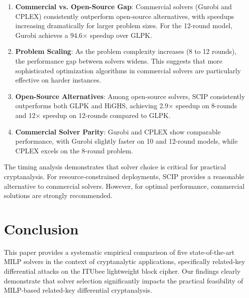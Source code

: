 \documentclass[11pt,a4paper]{article}
\begin{document}
\begin{enumerate}
    \item \textbf{Commercial vs. Open-Source Gap}: Commercial solvers (Gurobi and CPLEX) consistently outperform open-source alternatives, with speedups increasing dramatically for larger problem sizes. For the 12-round model, Gurobi achieves a 94.6$\times$ speedup over GLPK.
    
    \item \textbf{Problem Scaling}: As the problem complexity increases (8 to 12 rounds), the performance gap between solvers widens. This suggests that more sophisticated optimization algorithms in commercial solvers are particularly effective on harder instances.
    
    \item \textbf{Open-Source Alternatives}: Among open-source solvers, SCIP consistently outperforms both GLPK and HiGHS, achieving 2.9$\times$ speedup on 8-rounds and 12$\times$ speedup on 12-rounds compared to GLPK.
    
    \item \textbf{Commercial Solver Parity}: Gurobi and CPLEX show comparable performance, with Gurobi slightly faster on 10 and 12-round models, while CPLEX excels on the 8-round problem.
\end{enumerate}

The timing analysis demonstrates that solver choice is critical for practical cryptanalysis. For resource-constrained deployments, SCIP provides a reasonable alternative to commercial solvers. However, for optimal performance, commercial solutions are strongly recommended.

\section{Conclusion}

This paper provides a systematic empirical comparison of five state-of-the-art MILP solvers in the context of cryptanalytic applications, specifically related-key differential attacks on the ITUbee lightweight block cipher. Our findings clearly demonstrate that solver selection significantly impacts the practical feasibility of MILP-based related-key differential cryptanalysis.
\end{document}
